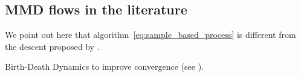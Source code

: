 



\subsection{MMD flows in the literature}

\begin{remark}
	We point out here that algorithm~\eqref{eq:sample_based_process} is different from the descent proposed by \cite{mroueh2018regularized}. 
\end{remark}

\begin{remark}
	Birth-Death Dynamics to improve convergence (see \cite{rotskoff2019global}).
\end{remark}
